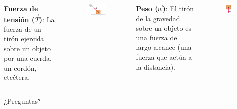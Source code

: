 \begin{frame}
    \begin{columns}
    \textbf{Fuerza de tensión ($\vec{T}$)}: La fuerza de un tirón ejercida sobre un objeto por una cuerda, un cordón, etcétera.
    \begin{figure}
        \centering
        \includegraphics[width=0.8\linewidth]{figures/tension.png}
    \end{figure}
    
    \textbf{Peso ($\vec{w}$)}: El tirón de la gravedad sobre un objeto es una fuerza de largo alcance (una fuerza que actúa a la distancia).
    \begin{figure}
        \centering
        \includegraphics[width=0.4\linewidth]{figures/peso.png}
    \end{figure}
\end{columns}
\end{frame}

\begin{frame}
    \begin{center}
        \Huge ¿Preguntas?
    \end{center}
\end{frame}

